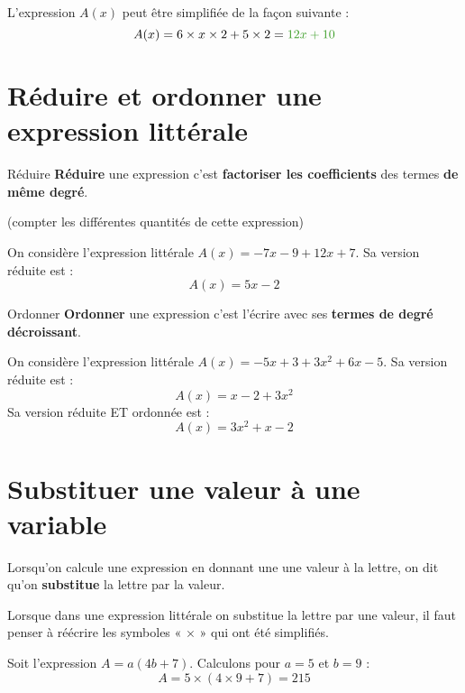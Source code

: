 \documentclass[a4paper,dvipsnames]{article}
\begin{document}
\begin{Ex}
L'expression $A(x)$ peut être simplifiée de la façon suivante :
\[A(x)=6\times x\times 2+5\times2=\textcolor{sacado_green}{12x+10}\]
\end{Ex}

\section{Réduire et ordonner une expression littérale}

\begin{DefT}{Réduire}
\textbf{Réduire} une expression c'est \textbf{factoriser les coefficients} des termes \textbf{de même degré}.

(compter les différentes quantités de cette expression)
\end{DefT}

\begin{Ex}
On considère l'expression littérale $A(x)=-7x-9+12x+7$. Sa version réduite est :
\[A(x)=5x-2\]
\end{Ex}

\begin{DefT}{Ordonner}
\textbf{Ordonner} une expression c'est l'écrire avec ses \textbf{termes de degré décroissant}.
\end{DefT}

\begin{Ex}
On considère l'expression littérale $A(x)=-5x+3+3x^2+6x-5$. Sa version réduite est :
\[A(x)=x-2+3x^2\]
Sa version réduite ET ordonnée est :
\[A(x)=3x^2+x-2\]
\end{Ex}

\section{Substituer une valeur à une variable}

\begin{Def}
Lorsqu'on calcule une expression en donnant une une valeur à la lettre,  on dit qu'on \textbf{substitue} la lettre par la valeur.
\end{Def}

\begin{Rq}
Lorsque dans une expression littérale on substitue la lettre par une valeur, il faut penser à réécrire les symboles « $\times$ » qui ont été simplifiés.
\end{Rq}

\begin{Ex}
Soit l'expression $A=a(4b+7)$. Calculons pour $a=5$ et $b=9$ :
\[A=5\times(4\times9+7)=215\]
\end{Ex}
\end{document}
